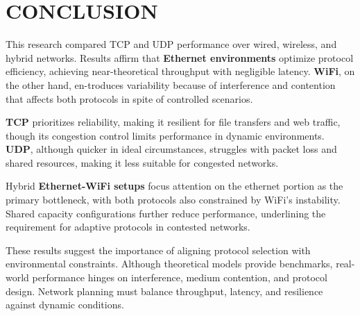 \section{CONCLUSION} \label{sec:conclusion}

    This research compared TCP and UDP performance over wired, wireless, and hybrid networks. 
    Results affirm that \textbf{Ethernet environments} optimize protocol efficiency, achieving near-theoretical throughput with negligible latency. 
    \textbf{WiFi}, on the other hand, en-troduces variability because of interference and contention that affects both protocols in spite of controlled scenarios.
    
    \noindent
    \textbf{TCP} prioritizes reliability, making it resilient for file transfers and web traffic, though its congestion control limits performance in dynamic environments. 
    \textbf{UDP}, although quicker in ideal circumstances, struggles with packet loss and shared resources, making it less suitable for congested networks.

    \noindent
    Hybrid \textbf{Ethernet-WiFi setups} focus attention on the ethernet portion as the primary bottleneck, with both protocols also constrained by WiFi’s instability. 
    Shared capacity configurations further reduce performance, underlining the requirement for adaptive protocols in contested networks.

    \noindent
    These results suggest the importance of aligning protocol selection with environmental constraints. 
    Although theoretical models provide benchmarks, real-world performance hinges on interference, medium contention, and protocol design. 
    Network planning must balance throughput, latency, and resilience against dynamic conditions.

        
